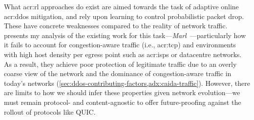 
What \gls{acr:rl} approaches do exist are aimed towards the task of adaptive online \gls{acr:ddos} mitigation, and rely upon learning to control probabilistic packet drop.
These have concrete weaknesses compared to the reality of network traffic.
 presents my analysis of the existing work for this task---\emph{Marl}~\parencite{DBLP:journals/eaai/MalialisK15}---particularly how it fails to account for congestion-aware traffic (i.e., \gls{acr:tcp}) and environments with high host density per egress point such as \glspl{acr:isp} or datacentre networks.
As a result, they achieve poor protection of legitimate traffic due to an overly coarse view of the network and the dominance of congestion-aware traffic in today's networks (\cref{sec:ddos-contributing-factors,adx:caida-traffic}).
However, there are limits to how we should infer these properties given network evolution---we must remain protocol- and content-agnostic to offer future-proofing against the rollout of protocols like QUIC.


